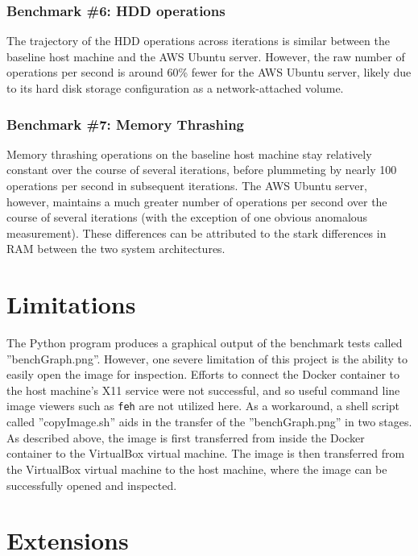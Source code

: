 \documentclass[sigconf]{acmart}
\begin{document}
\subsubsection{Benchmark \#6: HDD operations}

The trajectory of the HDD operations across iterations is similar between the baseline host machine and the AWS Ubuntu server. However, the raw number of operations per second is around 60\% fewer for the AWS Ubuntu server, likely due to its hard disk storage configuration as a network-attached volume.

\subsubsection{Benchmark \#7: Memory Thrashing}

Memory thrashing operations on the baseline host machine stay relatively constant over the course of several iterations, before plummeting by nearly 100 operations per second in subsequent iterations. The AWS Ubuntu server, however, maintains a much greater number of operations per second over the course of several iterations (with the exception of one obvious anomalous measurement). These differences can be attributed to the stark differences in RAM between the two system architectures.

\section{Limitations}

The Python program produces a graphical output of the benchmark tests called ''benchGraph.png''. However, one severe limitation of this project is the ability to easily open the image for inspection. Efforts to connect the Docker container to the host machine's X11 service were not successful, and so useful command line image viewers such as {\tt feh} are not utilized here. As a workaround, a shell script called ''copyImage.sh'' aids in the transfer of the ''benchGraph.png'' in two stages. As described above, the image is first transferred from inside the Docker container to the VirtualBox virtual machine. The image is then transferred from the VirtualBox virtual machine to the host machine, where the image can be successfully opened and inspected. 

\section{Extensions}
\end{document}
